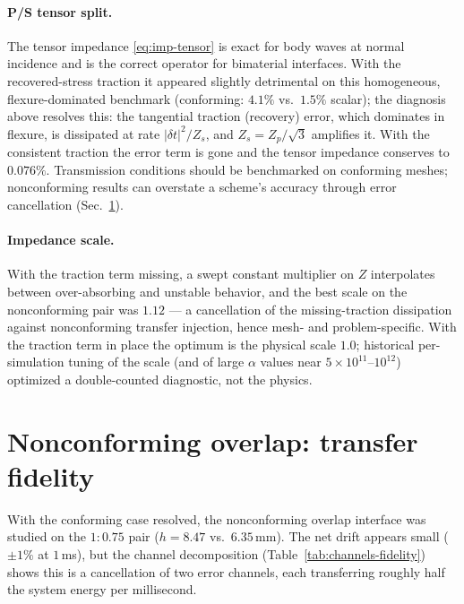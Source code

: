\documentclass[11pt]{article}
\begin{document}
\paragraph{P/S tensor split.} The tensor impedance \eqref{eq:imp-tensor} is
exact for body waves at normal incidence and is the correct operator for
bimaterial interfaces. With the recovered-stress traction it appeared
slightly detrimental on this homogeneous, flexure-dominated benchmark
(conforming: $4.1\%$ vs.\ $1.5\%$ scalar); the diagnosis above resolves
this: the tangential traction (recovery) error, which dominates in flexure,
is dissipated at rate $\lvert \delta t \rvert^2/Z_s$, and
$Z_s = Z_p/\sqrt{3}$ amplifies it. With the consistent traction the error
term is gone and the tensor impedance conserves to $0.076\%$. Transmission
conditions should be benchmarked on conforming meshes; nonconforming
results can overstate a scheme's accuracy through error cancellation
(Sec.~\ref{sec:fidelity}).

\paragraph{Impedance scale.} With the traction term missing, a swept
constant multiplier on $Z$ interpolates between over-absorbing and unstable
behavior, and the best scale on the nonconforming pair was $1.12$ --- a
cancellation of the missing-traction dissipation against nonconforming
transfer injection, hence mesh- and problem-specific. With the traction term
in place the optimum is the physical scale $1.0$; historical per-simulation
tuning of the scale (and of large $\alpha$ values near
$5\times 10^{11}$--$10^{12}$) optimized a double-counted diagnostic, not the
physics.

\section{Nonconforming overlap: transfer fidelity}
\label{sec:fidelity}

With the conforming case resolved, the nonconforming overlap interface was
studied on the $1{:}0.75$ pair ($h = 8.47$ vs.\ $6.35$\,mm). The net drift
appears small ($\pm 1\%$ at $1$\,ms), but the channel decomposition
(Table~\ref{tab:channels-fidelity}) shows this is a cancellation of two
error channels, each transferring roughly half the system energy per millisecond.
\end{document}
